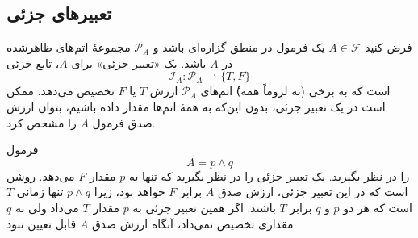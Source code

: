   \subsection*{تعبیرهای جزئی}
    \begin{definition}[تعریف \lr{2.18}]
      فرض کنید $A\in \mathscr{F}$ یک فرمول در منطق گزاره‌ای باشد و $\mathscr{P}_{A}$ مجموعهٔ اتم‌های ظاهرشده در $A$ باشد.  
      یک «تعبیر جزئی» برای $A$، تابع جزئی  
      \[
      \mathscr{I}_{A} : \mathscr{P}_{A} \rightharpoonup \{T, F\}
      \]
      است که به برخی (نه لزوماً همه)ٔ اتم‌های $\mathscr{P}_{A}$ ارزش $T$ یا $F$ تخصیص می‌دهد.
      ممکن است در یک تعبیر جزئی، بدون این‌که به همهٔ اتم‌ها مقدار داده باشیم، بتوان ارزش صدق فرمول $A$ را مشخص کرد.
    \end{definition}
    \begin{example}[مثال \lr{2.19}]
      فرمول
      \[
      A = p \land q
      \]
      را در نظر بگیرید. یک تعبیر جزئی را در نظر بگیرید که تنها به $p$ مقدار $F$ می‌دهد. روشن است که در این تعبیر جزئی، ارزش صدق $A$ برابر $F$ خواهد بود، زیرا $p \land q$ تنها زمانی $T$ است که هر دو $p$ و $q$ برابر $T$ باشند.
      اگر همین تعبیر جزئی به $p$ مقدار $T$ می‌داد ولی به $q$ مقداری تخصیص نمی‌داد، آنگاه ارزش صدق $A$ قابل تعیین نبود.
    \end{example}